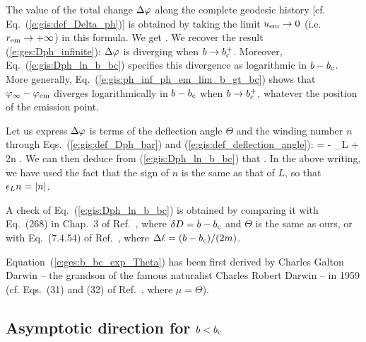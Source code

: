 The value of the total change $\Delta\varphi$ along the complete geodesic history
[cf. Eq.~(\ref{e:gis:def_Delta_ph})]
is obtained by taking the limit $u_{\rm em}\to 0$ (i.e. $r_{\rm em} \to +\infty$)
in this formula. We get
\be \label{e:gis:Dph_ln_b_bc}
    .
\ee
We recover the result (\ref{e:ges:Dph_infinite}): $\Delta\varphi$ is diverging
when $b\to b_{\rm c}^+$. Moreover, Eq.~(\ref{e:gis:Dph_ln_b_bc}) specifies
this divergence as logarithmic in $b - b_{\rm c}$. More generally,
Eq.~(\ref{e:gis:ph_inf_ph_em_lim_b_gt_bc}) shows that $\varphi_\infty - \varphi_{\rm em}$
diverges logarithmically in $b - b_{\rm c}$ when $b\to b_{\rm c}^+$, whatever the position
of the emission point.

Let us express $\Delta\varphi$ is terms of the deflection angle $\Theta$ and
the winding number $n$ through Eqs.~(\ref{e:gis:def_Dph_bar}) and
(\ref{e:gis:def_deflection_angle}):
\be
    \Delta\ph = \Theta - \eps_L \pi + 2\pi n .
\ee
We can then deduce from (\ref{e:gis:Dph_ln_b_bc}) that
\be \label{e:ges:b_bc_exp_Theta}
   .
\ee
In the above writing, we have used the fact that the sign of $n$ is the same
as that of $L$, so that $\epsilon_L n = |n|$.
\begin{remark}
A check of Eq.~(\ref{e:gis:Dph_ln_b_bc}) is obtained by comparing it with
Eq.~(268) in Chap.~3 of Ref.~\cite{Chand83}, where $\delta D = b-b_{\rm c}$ and
$\Theta$ is the same as ours, or with Eq.~(7.4.54) of Ref.~\cite{FroloZ11},
where $\Delta\ell = (b - b_{\rm c})/(2 m)$.
\end{remark}

\begin{hist} \label{h:gis:Darwin_formula}
Equation~(\ref{e:ges:b_bc_exp_Theta}) has been first derived by
Charles Galton Darwin -- the grandson of the famous naturalist Charles Robert Darwin -- in 1959 \cite{Darwi59} (cf. Eqs.~(31) and (32) of Ref.~\cite{Darwi59}, where $\mu = \Theta$).
\end{hist}


\subsection{Asymptotic direction for $b < b_{\rm c}$}

